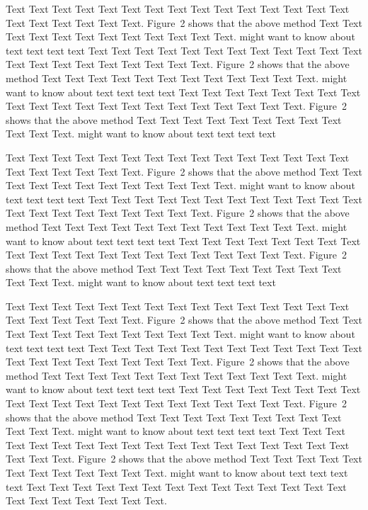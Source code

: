\documentclass{bioinfo}
\begin{document}
\begin{methods}
Text Text Text Text Text Text  Text Text Text Text Text Text Text
Text Text  Text Text Text Text Text Text.
Figure~2\vphantom{\ref{fig:02}} shows that the above method  Text
Text Text Text  Text Text Text Text Text Text  Text Text.
\citealp{Boffelli03} might want to know about  text text text text
Text Text Text Text Text Text  Text Text Text Text Text Text Text
Text Text  Text Text Text Text Text Text.
Figure~2\vphantom{\ref{fig:02}} shows that the above method  Text
Text Text Text  Text Text Text Text Text Text  Text Text.
\citealp{Boffelli03} might want to know about  text text text text
Text Text Text Text Text Text Text Text Text Text Text Text Text
Text Text  Text Text Text Text Text Text.
Figure~2\vphantom{\ref{fig:02}} shows that the above method  Text
Text Text Text  Text Text Text Text Text Text  Text Text.
\citealp{Boffelli03} might want to know about  text text text text


Text Text Text Text Text Text  Text Text Text Text Text Text Text
Text Text  Text Text Text Text Text Text.
Figure~2\vphantom{\ref{fig:02}} shows that the above method  Text
Text Text Text  Text Text Text Text Text Text  Text Text.
\citealp{Boffelli03} might want to know about  text text text text
Text Text Text Text Text Text  Text Text Text Text Text Text Text
Text Text  Text Text Text Text Text Text.
Figure~2\vphantom{\ref{fig:02}} shows that the above method  Text
Text Text Text  Text Text Text Text Text Text  Text Text.
\citealp{Boffelli03} might want to know about  text text text text
Text Text Text Text Text Text Text Text Text Text Text Text Text
Text Text  Text Text Text Text Text Text.
Figure~2\vphantom{\ref{fig:02}} shows that the above method  Text
Text Text Text  Text Text Text Text Text Text  Text Text.
\citealp{Boffelli03} might want to know about  text text text text

Text Text Text Text Text Text  Text Text Text Text Text Text Text
Text Text  Text Text Text Text Text Text.
Figure~2\vphantom{\ref{fig:02}} shows that the above method  Text
Text Text Text  Text Text Text Text Text Text  Text Text.
\citealp{Boffelli03} might want to know about  text text text text
Text Text Text Text Text Text  Text Text Text Text Text Text Text
Text Text  Text Text Text Text Text Text.
Figure~2\vphantom{\ref{fig:02}} shows that the above method  Text
Text Text Text  Text Text Text Text Text Text  Text Text.
\citealp{Boffelli03} might want to know about  text text text text
Text Text Text Text Text Text Text Text Text Text Text Text Text
Text Text  Text Text Text Text Text Text.
Figure~2\vphantom{\ref{fig:02}} shows that the above method  Text
Text Text Text  Text Text Text Text Text Text  Text Text.
\citealp{Boffelli03} might want to know about  text text text text
Text Text Text Text Text Text  Text Text Text Text Text Text Text
Text Text  Text Text Text Text Text Text.
Figure~2\vphantom{\ref{fig:02}} shows that the above method  Text
Text Text Text  Text Text Text Text Text Text  Text Text.
\citealp{Boffelli03} might want to know about  text text text text
Text Text Text Text Text Text Text Text Text Text Text Text Text
Text Text  Text Text Text Text Text Text.



\end{methods}
\end{document}

